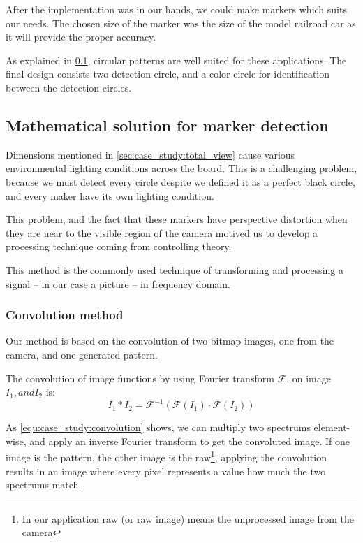 After the implementation was in our hands, we could make markers which suits our needs. The chosen size of the marker was the size of the model railroad car as it will provide the proper accuracy.

As explained in \cref{fig:case_study:opencv_math}, circular patterns are well suited for these applications. The final design consists two detection circle, and a color circle for identification between the detection circles.

\subsection{Mathematical solution for marker detection}
\label{fig:case_study:opencv_math}


Dimensions mentioned in \cref{sec:case_study:total_view} cause various environmental lighting conditions across the board. This is a challenging problem, because we must detect every circle despite we defined it as a perfect black circle, and every maker have its own lighting condition. 

This problem, and the fact that these markers have perspective distortion when they are near to the visible region of the camera motived us to develop a processing technique coming from controlling theory.

This method is the commonly used technique of transforming and processing a signal -- in our case a picture -- in frequency domain.

\subsubsection{Convolution method}
\label{sec:case_study:convolution}

Our method is based on the convolution of two bitmap images, one from the camera, and one generated pattern.

\begin{dfn}
	The convolution of image functions by using Fourier transform $\mathscr{F}$, on image $I_1, and I_2$ is:
	\begin{equation}
		\label{equ:case_study:convolution}
		I_1 \ast I_2 = \mathscr{F}^{-1}(\mathscr{F}(I_1) \cdot \mathscr{F}(I_2))
	\end{equation}
\end{dfn}

As \cref{equ:case_study:convolution} shows, we can multiply two spectrums element-wise, and apply an inverse Fourier transform to get the convoluted image. If one image is the pattern, the other image is the raw\footnote{In our application raw (or raw image) means the unprocessed image from the camera}, applying the convolution results in an image where every pixel represents a value how much the two spectrums match.

